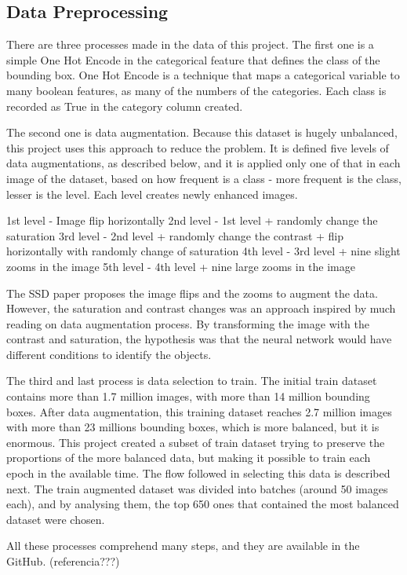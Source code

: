 \documentclass[11pt, a4paper, twocolumn]{article}
\begin{document}
\subsection{Data Preprocessing}

There are three processes made in the data of this project. The first one is a simple One Hot Encode in the categorical feature that defines the class of the bounding box. One Hot Encode is a technique that maps a categorical variable to many boolean features, as many of the numbers of the categories. Each class is recorded as True in the category column created.

The second one is data augmentation. Because this dataset is hugely unbalanced, this project uses this approach to reduce the problem. It is defined five levels of data augmentations, as described below, and it is applied only one of that in each image of the dataset, based on how frequent is a class - more frequent is the class, lesser is the level. Each level creates newly enhanced images.

1st level - Image flip horizontally
2nd level - 1st level + randomly change the saturation 
3rd level - 2nd level + randomly change the contrast + flip horizontally with randomly change of saturation 
4th level - 3rd level + nine slight zooms in the image
5th level - 4th level + nine large zooms in the image

The SSD paper proposes the image flips and the zooms to augment the data. However, the saturation and contrast changes was an approach inspired by much reading on data augmentation process. By transforming the image with the contrast and saturation, the hypothesis was that the neural network would have different conditions to identify the objects. 

The third and last process is data selection to train. The initial train dataset contains more than 1.7 million images, with more than 14 million bounding boxes. After data augmentation, this training dataset reaches 2.7 million images with more than 23 millions bounding boxes, which is more balanced, but it is enormous. This project created a subset of train dataset trying to preserve the proportions of the more balanced data, but making it possible to train each epoch in the available time. The flow followed in selecting this data is described next. The train augmented dataset was divided into batches (around 50 images each), and by analysing them, the top 650 ones that contained the most balanced dataset were chosen.

All these processes comprehend many steps, and they are available in the GitHub. (referencia???)
\end{document}
